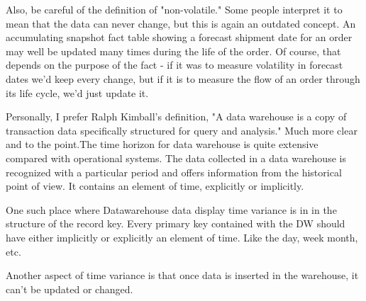 \documentclass{article}
\begin{document}
Also, be careful of the definition of "non-volatile." Some people interpret it to mean that the data can never change, but this is again an outdated concept. An accumulating snapshot fact table showing a forecast shipment date for an order may well be updated many times during the life of the order. Of course, that depends on the purpose of the fact - if it was to measure volatility in forecast dates we'd keep every change, but if it is to measure the flow of an order through its life cycle, we'd just update it.

Personally, I prefer Ralph Kimball's definition, "A data warehouse is a copy of transaction data specifically structured for query and analysis." Much more clear and to the point.The time horizon for data warehouse is quite extensive compared with operational systems. The data collected in a data warehouse is recognized with a particular period and offers information from the historical point of view. It contains an element of time, explicitly or implicitly.

One such place where Datawarehouse data display time variance is in in the structure of the record key. Every primary key contained with the DW should have either implicitly or explicitly an element of time. Like the day, week month, etc.

Another aspect of time variance is that once data is inserted in the warehouse, it can't be updated or changed.
 
 \newpage
\end{document}
